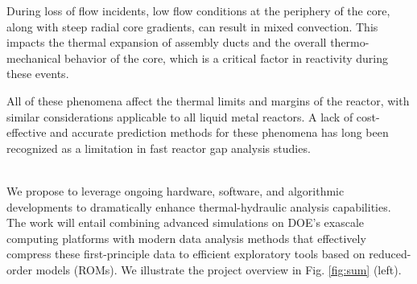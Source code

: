 During loss of flow incidents, low flow conditions at the periphery of the core, along with steep radial core gradients, can result in mixed convection. This impacts the thermal expansion of assembly ducts and the overall thermo-mechanical behavior of the core, which is a critical factor in reactivity during these events.

All of these phenomena affect the thermal limits and margins of the reactor, with similar considerations applicable to all liquid metal reactors. A lack of cost-effective and accurate prediction methods for these phenomena has long been recognized as a limitation in fast reactor gap analysis studies.

 \\[-4ex]

We propose to leverage ongoing hardware, software, and algorithmic developments
to dramatically enhance thermal-hydraulic analysis capabilities.  The work will
entail combining advanced simulations on DOE's exascale computing platforms
with modern data analysis methods that effectively compress these
first-principle data to efficient exploratory tools based on reduced-order
models (ROMs).
We illustrate the project overview in Fig. \ref{fig:sum} (left).


